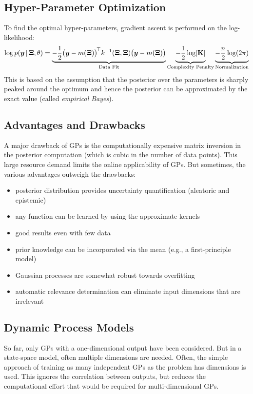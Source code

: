 		\subsection{Hyper-Parameter Optimization}
			To find the optimal hyper-parameters, gradient ascent is performed on the log-likelihood:
			\begin{equation}
				\log p(\bm{y} \,\vert\, \bm{\mathrm{\Xi}}, \theta)
				= \underbrace{-\frac{1}{2} \bigl( \bm{y} - m(\bm{\mathrm{\Xi}}) \bigr)^{\!\top} k^{-1}(\bm{\mathrm{\Xi}}, \bm{\mathrm{\Xi}}) \bigl( \bm{y} - m(\bm{\mathrm{\Xi}}) \bigr)}_\text{Data Fit}
				\underbrace{-\frac{1}{2} \log \lvert \bm{\mathrm{K}} \rvert}_\text{Complexity Penalty}
				\underbrace{-\frac{n}{2} \log(2\pi)}_\text{Normalization}
			\end{equation}
			This is based on the assumption that the posterior over the parameters is sharply peaked around the optimum and hence the posterior can be approximated by the exact value (called \emph{empirical Bayes}).

		\subsection{Advantages and Drawbacks}
			A major drawback of GPs is the computationally expensive matrix inversion in the posterior computation (which is cubic in the number of data points). This large resource demand limits the online applicability of GPs. But sometimes, the various advantages outweigh the drawbacks:
			\begin{itemize}
				\item posterior distribution provides uncertainty quantification (aleatoric and epistemic)
				\item any function can be learned by using the approximate kernels
				\item good results even with few data
				\item prior knowledge can be incorporated via the mean (e.g., a first-principle model)
				\item Gaussian processes are somewhat robust towards overfitting
				\item automatic relevance determination can eliminate input dimensions that are irrelevant
			\end{itemize}

		\subsection{Dynamic Process Models}
			So far, only GPs with a one-dimensional output have been considered. But in a state-space model, often multiple dimensions are needed. Often, the simple approach of training as many independent GPs as the problem has dimensions is used. This ignores the correlation between outputs, but reduces the computational effort that would be required for multi-dimensional GPs.


